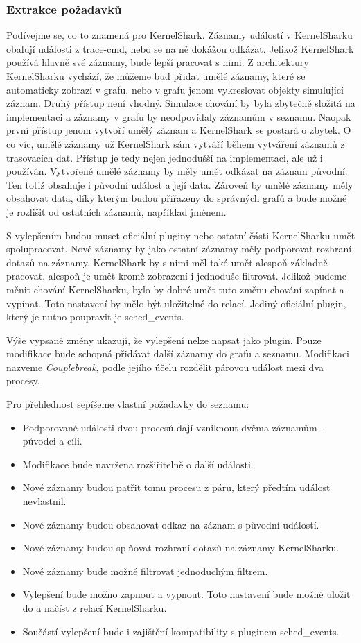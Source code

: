 \subsubsection*{Extrakce požadavků}
Podívejme se, co to znamená pro KernelShark. Záznamy událostí v KernelSharku obalují události z trace-cmd, nebo se na ně dokážou odkázat. Jelikož KernelShark používá hlavně své záznamy, bude lepší pracovat s nimi. Z architektury KernelSharku vychází, že můžeme buď přidat umělé záznamy, které se automaticky zobrazí v grafu, nebo v grafu jenom vykreslovat objekty simulující záznam. Druhý přístup není vhodný. Simulace chování by byla zbytečně složitá na implementaci a záznamy v grafu by neodpovídaly záznamům v seznamu. Naopak první přístup jenom vytvoří umělý záznam a KernelShark se postará o zbytek. O co víc, umělé záznamy už KernelShark sám vytváří během vytváření záznamů z trasovacích dat. Přístup je tedy nejen jednodušší na implementaci, ale už i používán. Vytvořené umělé záznamy by měly umět odkázat na záznam původní. Ten totiž obsahuje i původní událost a její data. Zároveň by umělé záznamy měly obsahovat data, díky kterým budou přiřazeny do správných grafů a bude možné je rozlišit od ostatních záznamů, například jménem.

S vylepšením budou muset oficiální pluginy nebo ostatní části KernelSharku umět spolupracovat. Nové záznamy by jako ostatní záznamy měly podporovat rozhraní dotazů na záznamy. KernelShark by s nimi měl také umět alespoň základně pracovat, alespoň je umět kromě zobrazení i jednoduše filtrovat. Jelikož budeme měnit chování KernelSharku, bylo by dobré umět tuto změnu chování zapínat a vypínat. Toto nastavení by mělo být uložitelné do relací. Jediný oficiální plugin, který je nutno poupravit je sched\_events.

Výše vypsané změny ukazují, že vylepšení nelze napsat jako plugin. Pouze modifikace bude schopná přidávat další záznamy do grafu a seznamu. Modifikaci nazveme \emph{Couplebreak}, podle jejího účelu rozdělit párovou událost mezi dva procesy.

Pro přehlednost sepíšeme vlastní požadavky do seznamu:
\begin{itemize}
    \item Podporované události dvou procesů dají vzniknout dvěma záznamům - původci a cíli.
    \item Modifikace bude navržena rozšiřitelně o další události.
    \item Nové záznamy budou patřit tomu procesu z páru, který předtím událost nevlastnil.
    \item Nové záznamy budou obsahovat odkaz na záznam s původní událostí.
    \item Nové záznamy budou splňovat rozhraní dotazů na záznamy KernelSharku.
    \item Nové záznamy bude možné filtrovat jednoduchým filtrem.
    \item Vylepšení bude možno zapnout a vypnout. Toto nastavení bude možné uložit do a načíst z relací KernelSharku.
    \item Součástí vylepšení bude i zajištění kompatibility s pluginem sched\_events.
\end{itemize}

